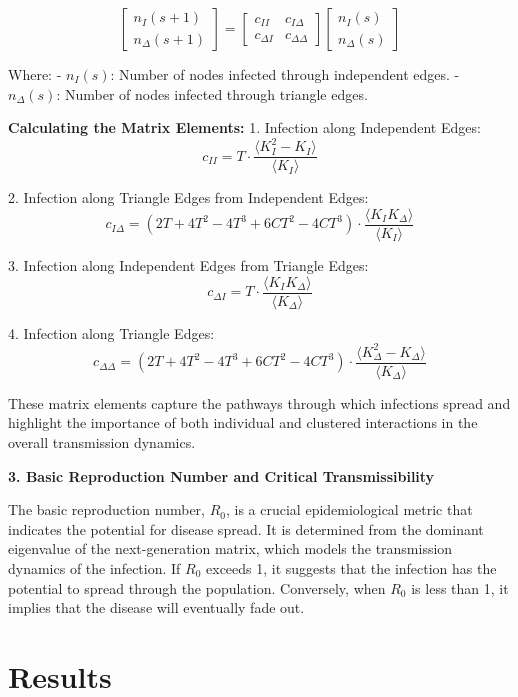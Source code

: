 \documentclass[9 pt]{article} %
\begin{document}
\[
\begin{bmatrix}
n_I(s+1) \\
n_\Delta(s+1)
\end{bmatrix}
=
\begin{bmatrix}
c_{II} & c_{I\Delta} \\
c_{\Delta I} & c_{\Delta \Delta}
\end{bmatrix}
\begin{bmatrix}
n_I(s) \\
n_\Delta(s)
\end{bmatrix}
\]

Where:
- \( n_I(s) \): Number of nodes infected through independent edges.
- \( n_\Delta(s) \): Number of nodes infected through triangle edges.

\textbf{Calculating the Matrix Elements:}
1. Infection along Independent Edges:
   \[
   c_{II} = T \cdot \frac{\langle K_I^2 - K_I \rangle}{\langle K_I \rangle}
   \]
   
2. Infection along Triangle Edges from Independent Edges:
   \[
   c_{I\Delta} = (2T + 4T^2 - 4T^3 + 6CT^2 - 4CT^3) \cdot \frac{\langle K_I K_\Delta \rangle}{\langle K_I \rangle}
   \]
   
3. Infection along Independent Edges from Triangle Edges:
   \[
   c_{\Delta I} = T \cdot \frac{\langle K_I K_\Delta \rangle}{\langle K_\Delta \rangle}
   \]
   
4. Infection along Triangle Edges:
   \[
   c_{\Delta \Delta} = (2T + 4T^2 - 4T^3 + 6CT^2 - 4CT^3) \cdot \frac{\langle K_\Delta^2 - K_\Delta \rangle}{\langle K_\Delta \rangle}
   \]

These matrix elements capture the pathways through which infections spread and highlight the importance of both individual and clustered interactions in the overall transmission dynamics.

\textbf{3. Basic Reproduction Number and Critical Transmissibility}

The basic reproduction number, \( R_0 \), is a crucial epidemiological metric that indicates the potential for disease spread. It is determined from the dominant eigenvalue of the next-generation matrix, which models the transmission dynamics of the infection. If \( R_0 \) exceeds 1, it suggests that the infection has the potential to spread through the population. Conversely, when \( R_0 \) is less than 1, it implies that the disease will eventually fade out.

\section{Results}
\end{document}
